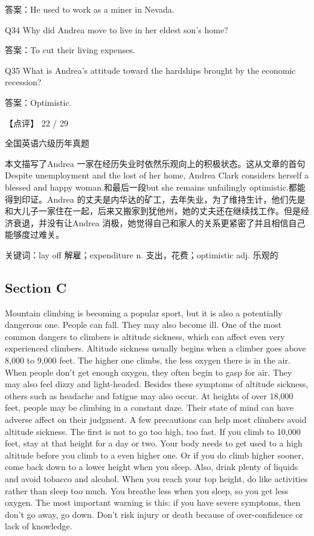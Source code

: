 \documentclass[UTF8,11pt]{ctexart}
\begin{document}
答案：He used to work as a miner in Nevada.


Q34 Why did Andrea move to live in her eldest son’s home?


答案：To cut their living expenses.


Q35 What is Andrea’s attitude toward the hardships brought by the economic recession?


答案：Optimistic.


【点评】 22 / 29


全国英语六级历年真题


本文描写了Andrea 一家在经历失业时依然乐观向上的积极状态。这从文章的首句Despite unemployment and the lost of her home, Andrea Clark considers herself a blessed and happy woman.和最后一段but she remains unfailingly optimistic.都能得到印证。Andrea 的丈夫是内华达的矿工，去年失业，为了维持生计，他们先是和大儿子一家住在一起，后来又搬家到犹他州，她的丈夫还在继续找工作。但是经济衰退，并没有让Andrea 消极，她觉得自己和家人的关系更紧密了并且相信自己能够度过难关。


关键词：lay off 解雇；expenditure n. 支出，花费；optimistic adj. 乐观的


\subsection*{Section C}


Mountain climbing is becoming a popular sport, but it is also a potentially dangerous one. People can fall. They may also become ill. One of the most common dangers to climbers is altitude sickness, which can affect even very experienced climbers. Altitude sickness usually begins when a climber goes above 8,000 to 9,000 feet. The higher one climbs, the less oxygen there is in the air. When people don’t get enough oxygen, they often begin to gasp for air. They may also feel dizzy and light-headed. Besides these symptoms of altitude sickness, others such as headache and fatigue may also occur. At heights of over 18,000 feet, people may be climbing in a constant daze. Their state of mind can have adverse affect on their judgment. A few precautions can help most climbers avoid altitude sickness. The first is not to go too high, too fast. If you climb to 10,000 feet, stay at that height for a day or two. Your body needs to get used to a high altitude before you climb to a even higher one. Or if you do climb higher sooner, come back down to a lower height when you sleep. Also, drink plenty of liquids and avoid tobacco and alcohol. When you reach your top height, do like activities rather than sleep too much. You breathe less when you sleep, so you get less oxygen. The most important warning is this: if you have severe symptoms, then don’t go away, go down. Don’t risk injury or death because of over-confidence or lack of knowledge.
\end{document}

